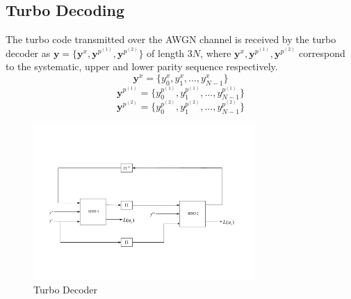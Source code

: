 \documentclass[20 pts]{article}
\begin{document}
 
 \subsection{Turbo Decoding}
 The turbo code transmitted over the AWGN channel is received by the turbo decoder as
  $\mathbf{y}=\{\mathbf{y}^x,\mathbf{y}^{p^{(1)}},\mathbf{y}^{p^{(2)}}\}$ 
  of length $3N$, where $\mathbf{y}^x,\mathbf{y}^{p^{(1)}},\mathbf{y}^{p^{(2)}}$
    correspond to the systematic, upper and lower parity sequence respectively.
    $$\mathbf{y}^x=\{y^x_0, y^x_1,...,y^x_{N-1}\}$$ 
    $$\mathbf{y}^{p^{(1)}}=\{y^{p^{(1)}}_0, y^{p^{(1)}}_1,...,y^{p^{(1)}}_{N-1} \}$$
 $$\mathbf{y}^{p^{(2)}}=\{y^{p^{(2)}}_0, y^{p^{(2)}}_1,...,y^{p^{(2)}}_{N-1}\}$$
\begin{figure}[h!]
\centering
		\includegraphics[width=0.75\textwidth]{D1.pdf}
		\caption{Turbo Decoder}
		\label{TDC}
		\end{figure}
	
\end{document}
